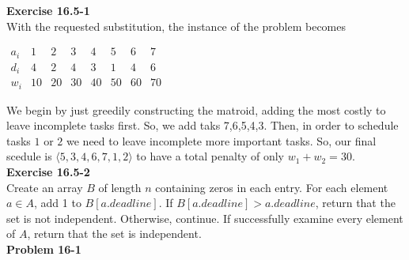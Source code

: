 \documentclass{article}
\begin{document}
\noindent\textbf{Exercise 16.5-1}\\

With the requested substitution, the instance of the problem becomes

$
\begin{array}{c|ccccccc}
a_i&1&2&3&4&5&6&7\\
\hline 
d_i&4&2&4&3&1&4&6\\
w_i &10&20&30&40&50&60&70
\end{array}
$

We begin by just greedily constructing the matroid, adding the most costly to leave incomplete tasks first. So, we add taks 7,6,5,4,3. Then, in order to schedule tasks $1$ or $2$ we need to leave incomplete more important tasks. So, our final scedule is $\langle 5,3,4,6,7,1,2\rangle$ to have a total penalty of only $w_1+w_2=30$.\\

\noindent\textbf{Exercise 16.5-2}\\

Create an array $B$ of length $n$ containing zeros in each entry.  For each element $a \in A$, add 1 to $B[a.deadline]$.  If $B[a.deadline] > a.deadline$, return that the set is not independent.  Otherwise, continue.  If successfully examine every element of $A$, return that the set is independent.  \\

\noindent\textbf{Problem 16-1}\\
\end{document}
